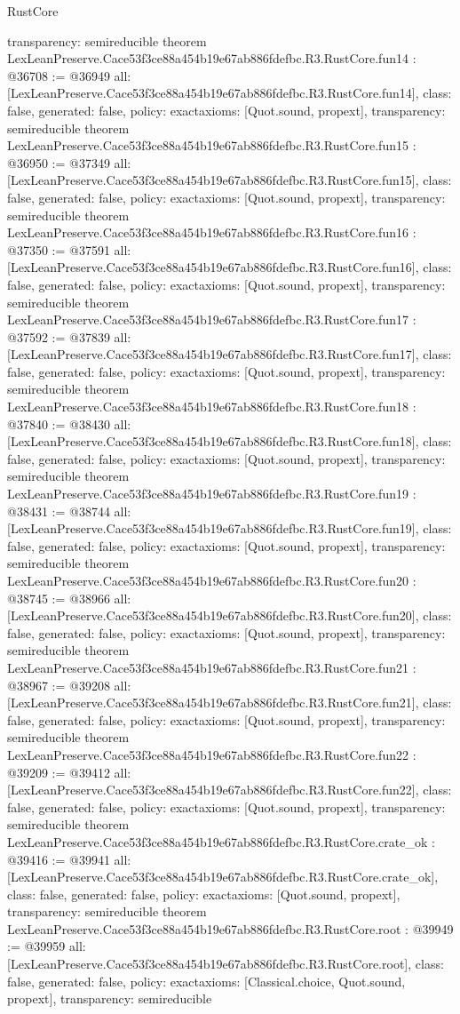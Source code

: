 \begin{lexlean}{RustCore}
\begin{coremodule}
{  transparency: semireducible
}
theorem LexLeanPreserve.Cace53f3ce88a454b19e67ab886fdefbc.R3.RustCore.fun14 : @36708 := @36949 {
  all: [LexLeanPreserve.Cace53f3ce88a454b19e67ab886fdefbc.R3.RustCore.fun14],
  class: false,
  generated: false,
  policy: exact{axioms: [Quot.sound, propext]},
  transparency: semireducible
}
theorem LexLeanPreserve.Cace53f3ce88a454b19e67ab886fdefbc.R3.RustCore.fun15 : @36950 := @37349 {
  all: [LexLeanPreserve.Cace53f3ce88a454b19e67ab886fdefbc.R3.RustCore.fun15],
  class: false,
  generated: false,
  policy: exact{axioms: [Quot.sound, propext]},
  transparency: semireducible
}
theorem LexLeanPreserve.Cace53f3ce88a454b19e67ab886fdefbc.R3.RustCore.fun16 : @37350 := @37591 {
  all: [LexLeanPreserve.Cace53f3ce88a454b19e67ab886fdefbc.R3.RustCore.fun16],
  class: false,
  generated: false,
  policy: exact{axioms: [Quot.sound, propext]},
  transparency: semireducible
}
theorem LexLeanPreserve.Cace53f3ce88a454b19e67ab886fdefbc.R3.RustCore.fun17 : @37592 := @37839 {
  all: [LexLeanPreserve.Cace53f3ce88a454b19e67ab886fdefbc.R3.RustCore.fun17],
  class: false,
  generated: false,
  policy: exact{axioms: [Quot.sound, propext]},
  transparency: semireducible
}
theorem LexLeanPreserve.Cace53f3ce88a454b19e67ab886fdefbc.R3.RustCore.fun18 : @37840 := @38430 {
  all: [LexLeanPreserve.Cace53f3ce88a454b19e67ab886fdefbc.R3.RustCore.fun18],
  class: false,
  generated: false,
  policy: exact{axioms: [Quot.sound, propext]},
  transparency: semireducible
}
theorem LexLeanPreserve.Cace53f3ce88a454b19e67ab886fdefbc.R3.RustCore.fun19 : @38431 := @38744 {
  all: [LexLeanPreserve.Cace53f3ce88a454b19e67ab886fdefbc.R3.RustCore.fun19],
  class: false,
  generated: false,
  policy: exact{axioms: [Quot.sound, propext]},
  transparency: semireducible
}
theorem LexLeanPreserve.Cace53f3ce88a454b19e67ab886fdefbc.R3.RustCore.fun20 : @38745 := @38966 {
  all: [LexLeanPreserve.Cace53f3ce88a454b19e67ab886fdefbc.R3.RustCore.fun20],
  class: false,
  generated: false,
  policy: exact{axioms: [Quot.sound, propext]},
  transparency: semireducible
}
theorem LexLeanPreserve.Cace53f3ce88a454b19e67ab886fdefbc.R3.RustCore.fun21 : @38967 := @39208 {
  all: [LexLeanPreserve.Cace53f3ce88a454b19e67ab886fdefbc.R3.RustCore.fun21],
  class: false,
  generated: false,
  policy: exact{axioms: [Quot.sound, propext]},
  transparency: semireducible
}
theorem LexLeanPreserve.Cace53f3ce88a454b19e67ab886fdefbc.R3.RustCore.fun22 : @39209 := @39412 {
  all: [LexLeanPreserve.Cace53f3ce88a454b19e67ab886fdefbc.R3.RustCore.fun22],
  class: false,
  generated: false,
  policy: exact{axioms: [Quot.sound, propext]},
  transparency: semireducible
}
theorem LexLeanPreserve.Cace53f3ce88a454b19e67ab886fdefbc.R3.RustCore.crate_ok : @39416 := @39941 {
  all: [LexLeanPreserve.Cace53f3ce88a454b19e67ab886fdefbc.R3.RustCore.crate_ok],
  class: false,
  generated: false,
  policy: exact{axioms: [Quot.sound, propext]},
  transparency: semireducible
}
theorem LexLeanPreserve.Cace53f3ce88a454b19e67ab886fdefbc.R3.RustCore.root : @39949 := @39959 {
  all: [LexLeanPreserve.Cace53f3ce88a454b19e67ab886fdefbc.R3.RustCore.root],
  class: false,
  generated: false,
  policy: exact{axioms: [Classical.choice, Quot.sound, propext]},
  transparency: semireducible
}


\end{coremodule}
\end{lexlean}
